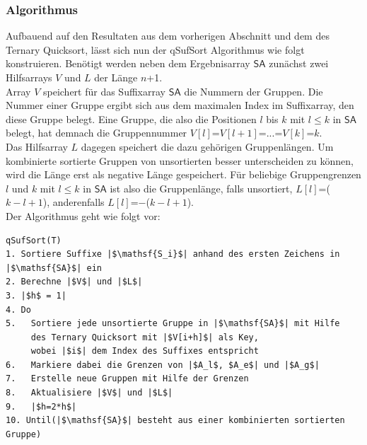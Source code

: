  \subsubsection{Algorithmus}
Aufbauend auf den Resultaten aus dem vorherigen Abschnitt und dem des Ternary Quicksort, lässt sich nun der qSufSort Algorithmus wie folgt konstruieren.
Benötigt werden neben dem Ergebnisarray $\mathsf{SA}$ zunächst zwei Hilfsarrays $V$ und $L$ der Länge $n$+1.\\
Array $V$ speichert für das Suffixarray $\mathsf{SA}$ die Nummern der Gruppen. Die Nummer einer Gruppe ergibt sich aus dem maximalen Index im Suffixarray, den diese Gruppe belegt. Eine Gruppe, die also die Positionen $l$ bis $k$ mit $l \leq k$ in $\mathsf{SA}$ belegt, hat demnach die Gruppennummer $V[l]$=$V[l+1]$=...=$V[k]$=$k$.\\
Das Hilfsarray $L$ dagegen speichert die dazu gehörigen Gruppenlängen. Um kombinierte sortierte Gruppen von unsortierten besser unterscheiden zu können, wird die Länge erst als negative Länge gespeichert. Für beliebige Gruppengrenzen $l$ und $k$ mit $l \leq k$ in $\mathsf{SA}$ ist also die Gruppenlänge, falls unsortiert, $L[l]$=($k-l+1$), anderenfalls $L[l]$=$-$($k-l+1$). \\
Der Algorithmus geht wie folgt vor:\\

\begin{verbatim}
qSufSort(T)
1. Sortiere Suffixe |$\mathsf{S_i}$| anhand des ersten Zeichens in |$\mathsf{SA}$| ein 
2. Berechne |$V$| und |$L$|
3. |$h$ = 1|
4. Do  
5.   Sortiere jede unsortierte Gruppe in |$\mathsf{SA}$| mit Hilfe
     des Ternary Quicksort mit |$V[i+h]$| als Key,
     wobei |$i$| dem Index des Suffixes entspricht
6.   Markiere dabei die Grenzen von |$A_l$, $A_e$| und |$A_g$|
7.   Erstelle neue Gruppen mit Hilfe der Grenzen
8.   Aktualisiere |$V$| und |$L$|
9.   |$h=2*h$|
10. Until(|$\mathsf{SA}$| besteht aus einer kombinierten sortierten Gruppe)
\end{verbatim}

